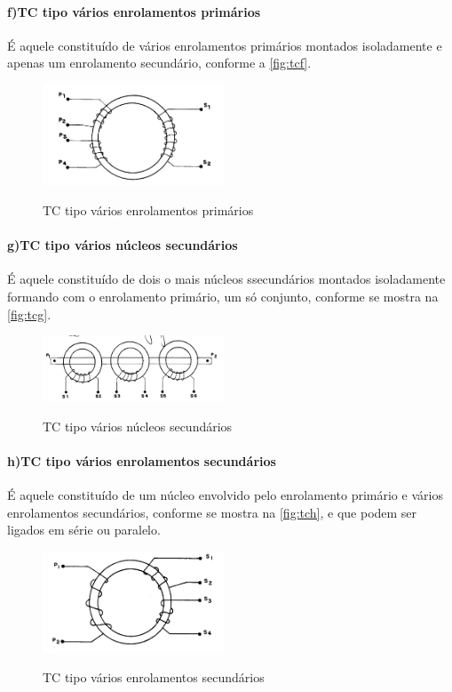 \documentclass[a5paper,english,spanish,brazil]{ufsc-thesis}
\begin{document}
				\paragraph*{f)\indent TC tipo vários enrolamentos primários}
					É aquele constituído de vários enrolamentos primários montados isoladamente e apenas um enrolamento secundário, conforme a \autoref{fig:tcf}.
					\begin{figure}[htb]
						\caption{TC tipo vários enrolamentos primários}
						\centering
						\includegraphics[width=5.4cm]{TC(6).png}
						\label{fig:tcf}
					\end{figure}
				\paragraph*{g)\indent TC tipo vários núcleos secundários}
					É aquele constituído de dois o mais núcleos ssecundários montados isoladamente formando com o enrolamento primário, um só conjunto, conforme se mostra na \autoref{fig:tcg}.
					\begin{figure}[htb]
						\caption{TC tipo vários núcleos secundários}
						\centering
						\includegraphics[width=5.4cm]{TC(7).png}
						\label{fig:tcg}
					\end{figure}
				\paragraph*{h)\indent TC tipo vários enrolamentos secundários}
					É aquele constituído de um núcleo envolvido pelo enrolamento primário e vários enrolamentos secundários, conforme se mostra na \autoref{fig:tch}, e que podem ser ligados em série ou paralelo.
					\begin{figure}[htb]
						\caption{TC tipo vários enrolamentos secundários}
						\centering
						\includegraphics[width=5.4cm]{TC(8).png}
						\label{fig:tch}
					\end{figure}
\end{document}
